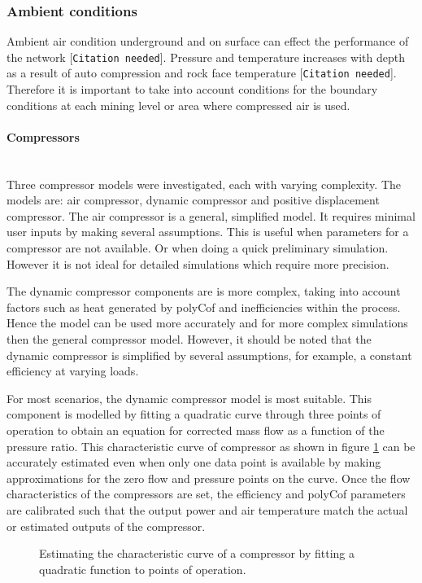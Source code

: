 		\subsubsection{Ambient conditions}
		Ambient air condition underground and on surface can effect the performance of the network [\texttt{Citation needed}]. Pressure and temperature increases with depth as a result of auto compression and rock face temperature [\texttt{Citation needed}]. Therefore it is important to take into account conditions for the boundary conditions at each mining level or area where compressed air is used.   
		\paragraph{Compressors}\leavevmode\\
		Three compressor models were investigated, each with varying complexity. The models are: air compressor, dynamic compressor and positive displacement compressor. The air compressor is a general, simplified model. It requires minimal user inputs by making several assumptions. This is useful when parameters for a compressor are not available. Or when doing a quick preliminary simulation. However it is not ideal for detailed simulations which require more precision. 
		\par 
		The dynamic compressor components are is more complex, taking into account factors such as heat generated by \gls{polyCof} and inefficiencies within the process. Hence the model can be used more accurately and for more complex simulations then the general compressor model. However, it should be noted that the dynamic compressor is simplified by several assumptions, for example, a constant efficiency at varying loads. 
		\par 	 
		For most scenarios, the dynamic compressor model is most suitable. This component is modelled by fitting a quadratic curve through three points of operation to obtain an equation for corrected mass flow as a function of the pressure ratio. This characteristic curve of compressor  as shown in figure \ref{fig: Compressor Curve} can be accurately estimated even when only one data point is available by making approximations for the zero flow and pressure points on the curve. Once the flow characteristics of the compressors are set, the efficiency and \gls{polyCof} parameters are calibrated such that the output power and air temperature match the actual or estimated outputs of the compressor.
		
		\begin{figure}[h]
			\centering
			\fbox{}
			\caption{Estimating the characteristic curve of a compressor by fitting a quadratic function to points of operation.}
			\label{fig: Compressor Curve}
		\end{figure}


